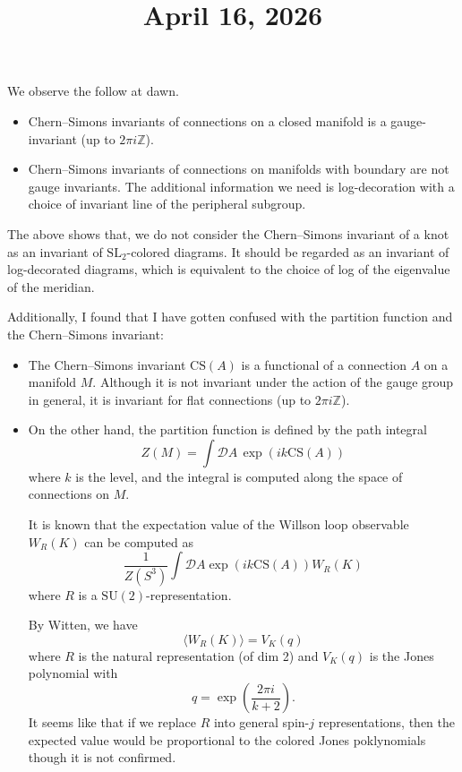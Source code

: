 \documentclass[11pt]{amsart}
\title{April 16, 2026}
\begin{document}
\maketitle

We observe the follow at dawn.
\begin{itemize}
    \item Chern--Simons invariants of connections on a closed manifold is a gauge-invariant (up to $2 \pi i \mathbb{Z}$).
    \item Chern--Simons invariants of connections on manifolds with boundary are not gauge invariants.
    The additional information we need is log-decoration with a choice of invariant line of the peripheral subgroup.
\end{itemize}
The above shows that, we do not consider the Chern--Simons invariant of a knot as an invariant of $\mathrm{SL}_2$-colored diagrams.
It should be regarded as an invariant of log-decorated diagrams, which is equivalent to the choice of log of the eigenvalue of the meridian.

Additionally, I found that I have gotten confused with the partition function and the Chern--Simons invariant:
\begin{itemize}
    \item The Chern--Simons invariant $\mathrm{CS}(A)$ is a functional of a connection $A$ on a manifold $M$.
    Although it is not invariant under the action of the gauge group in general, it is invariant for flat connections (up to $2 \pi i \mathbb{Z}$).

    \item On the other hand, the partition function is defined by the path integral
    \[
        Z(M) = \int \mathcal{D}A \, \exp \left( ik \mathrm{CS}(A) \right)
    \]
    where $k$ is the level, and the integral is computed along the space of connections on $M$.

    It is known that the expectation value of the Willson loop observable $W_R(K)$ can be computed as
    \[
        \frac{1}{Z(S^3)} \int \mathcal{D}A \exp \left( ik \mathrm{CS}(A) \right) W_R(K)
    \]
    where $R$ is a $\mathrm{SU}(2)$-representation.

    By Witten, we have
    \[
        \langle W_R(K) \rangle = V_K(q)
    \]
    where $R$ is the natural representation (of dim 2) and $V_K(q)$ is the Jones polynomial with
    \[
        q = \exp \left( \frac{2\pi i}{k + 2} \right).
    \]
    It seems like that if we replace $R$ into general spin-$j$ representations, then the expected value would be proportional to the colored Jones poklynomials though it is not confirmed.
\end{itemize}
\end{document}
